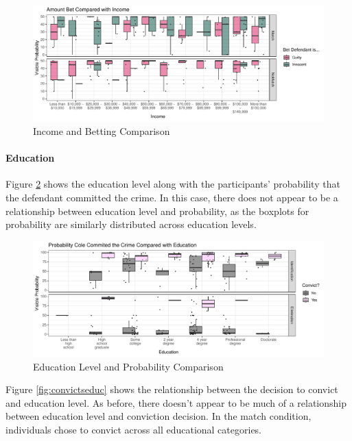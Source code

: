\documentclass[print]{nuthesis}
\begin{document}
\begin{figure}

{\centering \includegraphics[width=\linewidth]{thesis_files/figure-latex/incomebet-1} 

}

\caption{Income and Betting Comparison}\label{fig:incomebet}
\end{figure}

\hypertarget{education}{%
\paragraph{Education}\label{education}}

Figure \ref{fig:probeduc} shows the education level along with the participants' probability that the defendant committed the crime.
In this case, there does not appear to be a relationship between education level and probability, as the boxplots for probability are similarly distributed across education levels.

\begin{figure}

{\centering \includegraphics[width=\linewidth]{thesis_files/figure-latex/probeduc-1} 

}

\caption{Education Level and Probability Comparison}\label{fig:probeduc}
\end{figure}

Figure \ref{fig:convictseduc} shows the relationship between the decision to convict and education level.
As before, there doesn't appear to be much of a relationship between education level and conviction decision.
In the match condition, individuals chose to convict across all educational categories.
\end{document}
